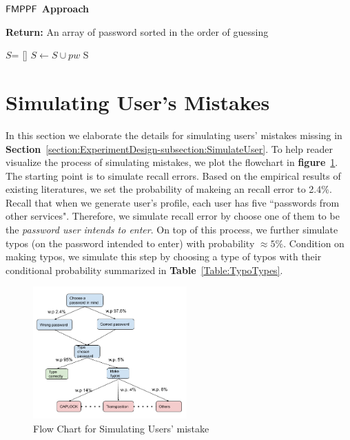 \begin{algorithm}[!htb]
	\caption{\textbf{$\mathsf{FMPPF}$ Approach}}\label{algorithm:FMPPF}
	\textbf{Return:} An array of password sorted in the order of guessing
	\begin{algorithmic}[1]
		\State $S$= []
		\State $S \leftarrow S \cup pw$ 
		\EndIf
		\EndFor
		\State \Return S
		\EndFunction
	\end{algorithmic}
\end{algorithm} 




\section{Simulating User's Mistakes}
In this section we elaborate the details for simulating users' mistakes missing in \textbf{Section}~\ref{section:ExperimentDesign-subsection:SimulateUser}. To help reader visualize the process of simulating mistakes, we plot the flowchart in \textbf{figure}~\ref{figure:flowChartTypo}. The starting point is to simulate recall errors. Based on the empirical results of existing literatures\cite{CCS:CWPCR17,SP:CAAJR16}, we set the probability of makeing an recall error to 2.4\%. Recall that when we generate user's profile, each user has five ``passwords from other services". Therefore, we simulate recall error by choose one of them to be the \emph{password user intends to enter}. On top of this process, we further simulate typos (on the password intended to enter) with probability $\approx 5\%$. Condition on making typos, we simulate this step by choosing a type of typos with their conditional probability summarized in \textbf{Table}~\ref{Table:TypoTypes}.

\begin{figure}[htb]
	\begin{center}
		\includegraphics[height=2in,width=\linewidth]{Figures/Experiments/FlowChartTypo.png}
		\caption{Flow Chart for Simulating Users' mistake}\label{figure:flowChartTypo}
	\end{center}
\end{figure}


